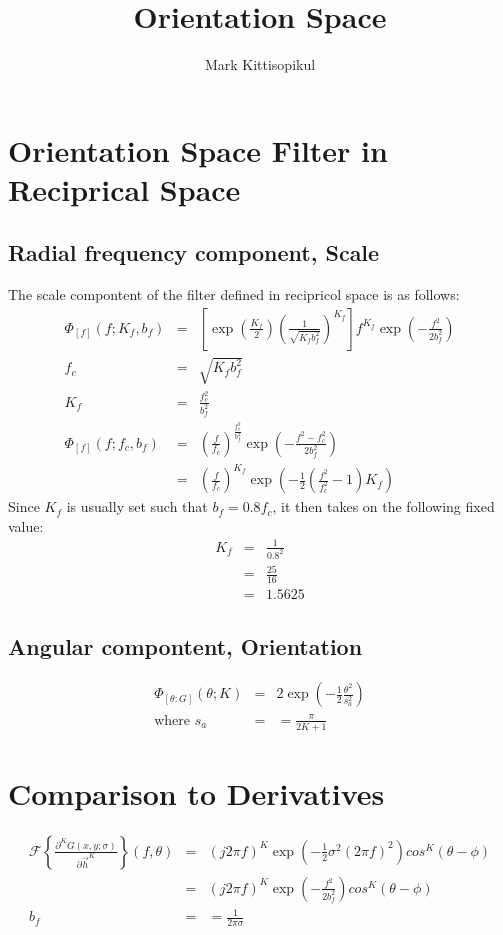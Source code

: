 \documentclass{article}
\title{Orientation Space}
\author{Mark Kittisopikul}
\begin{document}
\maketitle
\section{Orientation Space Filter in Reciprical Space}
\subsection{Radial frequency component, Scale}
The scale compontent of the filter defined in recipricol space is as follows:
\begin{eqnarray}
        \Phi_{[f]}(f;K_f,b_f) & = & \left[ \exp(\frac{K_f}{2}) \left( \frac{1}{\sqrt{K_fb_f^2}} \right)^{K_f} \right] f^{K_f} \exp(-\frac{f^2}{2b_f^2}) \\
        f_c & = & \sqrt{K_fb_f^2} \\
        K_f & = & \frac{f_c^2}{b_f^2} \\
        \Phi_{[f]}(f;f_c,b_f) & = & \left( \frac{f}{f_c} \right)^{\frac{f_c^2}{b_f^2}} \exp(-\frac{f^2-f_c^2}{2 b_f^2}) \\
        & = & \left( \frac{f}{f_c} \right)^{K_f} \exp(-\frac{1}{2}(\frac{f^2}{f_c^2}-1)K_f)
\end{eqnarray}
Since $ K_f $ is usually set such that $ b_f = 0.8 f_c $, it then takes on the following fixed value:
\begin{eqnarray}
      K_f   & = & \frac{1}{0.8^2} \\
            & = & \frac{25}{16} \\
            & = & 1.5625
    \end{eqnarray}
\subsection{Angular compontent, Orientation}
    \begin{eqnarray}
        \Phi_{[\theta:G]}(\theta;K)  & = &  2\exp(-\frac{1}{2}\frac{\theta^2}{s_a^2}) \\
        \mbox{where } s_a & = & = \frac{\pi}{2K+1}
    \end{eqnarray}
\section{Comparison to Derivatives}
\begin{eqnarray}
        \mathcal{F}\left\{ \frac{\partial^KG(x,y; \sigma)}{\partial \vec{h}^K}\right\}(f,\theta) & = & (j2\pi f)^K \exp(-\frac{1}{2} \sigma^2 (2\pi f)^2) cos^K(\theta - \phi) \\
        & = & (j2\pi f)^K \exp(-\frac{f^2}{2b_f^2}) cos^K(\theta - \phi) \\
        b_f & = & = \frac{1}{2\pi\sigma} \\
\end{eqnarray}
\end{document}

